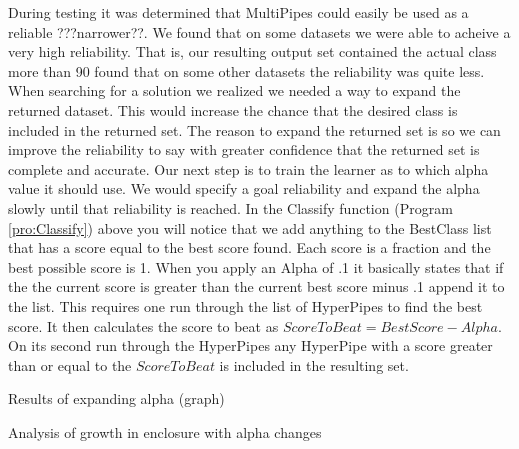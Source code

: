 During testing it was determined that MultiPipes could easily be used 
as a reliable ???narrower??. We found that on some datasets we were 
able to acheive a very high reliability. That is, our resulting output 
set contained the actual class more than 90%
found that on some other datasets the reliability was quite less. 
When searching for a solution we realized we needed a way to expand 
the returned dataset. This would increase the chance that the desired 
class is included in the returned set. The reason to expand the 
returned set is so we can improve the reliability to say with greater
confidence that the returned set is complete and accurate. Our next 
step is to train the learner as to which alpha value it should use. 
We would specify a goal reliability and expand the alpha slowly until 
that reliability is reached. In the Classify function (Program \ref{pro:Classify}) above you will 
notice that we add anything to the BestClass list that has a score 
equal to the best score found. Each score is a fraction and the best 
possible score is 1. When you apply an Alpha of .1 it basically 
states that if the the current score is greater than the current best 
score minus .1 append it to the list. This requires one run through the 
list of HyperPipes to find the best score. It then calculates the score 
to beat as \begin{math}ScoreToBeat = BestScore - Alpha\end{math}. On its second run through the 
HyperPipes any HyperPipe with a score greater than or equal to the 
\begin{math}ScoreToBeat\end{math} is included in the resulting set. 

Results of expanding alpha (graph)

Analysis of growth in enclosure with alpha changes

